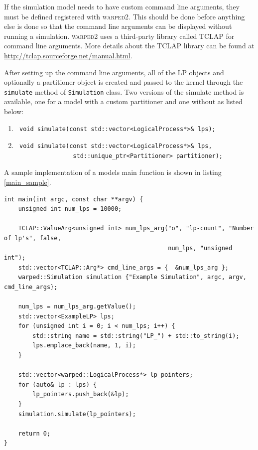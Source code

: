 \documentclass[11pt]{book}
\begin{document}
If the simulation model needs to have custom command line arguments, they must be
defined registered with \textsc{warped2}.  This should be done before anything else is done so that
the command line arguments can be displayed without running a simulation.  \textsc{warped2}
uses a third-party library called TCLAP for command line arguments.  More details about the
TCLAP library can be found at \url{http://tclap.sourceforge.net/manual.html}.

After setting up the command line arguments, all of the LP objects and optionally a partitioner
object is created and passed to the kernel through the \texttt{simulate} method of
\texttt{Simulation} class.  Two versions of the simulate method is available, one for a model
with a custom partitioner and one without as listed below:

\begin{enumerate}
    \item \begin{verbatim} void simulate(const std::vector<LogicalProcess*>& lps); \end{verbatim}
    \item \begin{verbatim} void simulate(const std::vector<LogicalProcess*>& lps,
                std::unique_ptr<Partitioner> partitioner); \end{verbatim}
\end{enumerate}

\noindent
A sample implementation of a models main function is shown in listing \ref{main_sample}.

\begin{lstlisting}[caption=Exmple \textsc{warped2} Main Definition, label=main_sample, float]
int main(int argc, const char **argv) {
    unsigned int num_lps = 10000;

    TCLAP::ValueArg<unsigned int> num_lps_arg("o", "lp-count", "Number of lp's", false,
                                              num_lps, "unsigned int");
    std::vector<TCLAP::Arg*> cmd_line_args = {  &num_lps_arg };
    warped::Simulation simulation {"Example Simulation", argc, argv, cmd_line_args};

    num_lps = num_lps_arg.getValue();
    std::vector<ExampleLP> lps;
    for (unsigned int i = 0; i < num_lps; i++) {
        std::string name = std::string("LP_") + std::to_string(i);
        lps.emplace_back(name, 1, i);
    }

    std::vector<warped::LogicalProcess*> lp_pointers;
    for (auto& lp : lps) {
        lp_pointers.push_back(&lp);
    }
    simulation.simulate(lp_pointers);

    return 0;
}
\end{lstlisting}
\end{document}
